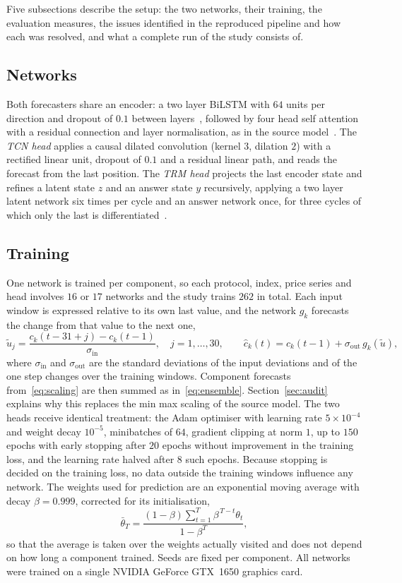 Five subsections describe the setup: the two networks, their training, the
evaluation measures, the issues identified in the reproduced pipeline and how
each was resolved, and what a complete run of the study consists of.

\subsection{Networks}
Both forecasters share an encoder: a two layer BiLSTM with $64$ units per
direction and dropout of $0.1$ between layers~\cite{rnnreview2024}, followed by
four head self attention with a residual connection and layer normalisation,
as in the source model~\cite{gong2024}. The \emph{TCN head} applies a causal
dilated convolution (kernel $3$, dilation $2$) with a rectified linear unit,
dropout of $0.1$ and a residual linear path, and reads the forecast from the
last position. The \emph{TRM head} projects the last encoder state and refines
a latent state $z$ and an answer state $y$ recursively, applying a two layer
latent network six times per cycle and an answer network once, for three
cycles of which only the last is differentiated~\cite{jolicoeur2025}.

\subsection{Training}
One network is trained per component, so each protocol, index, price series
and head involves $16$ or $17$ networks and the study trains $262$ in total.
Each input window is expressed relative to its own last value, and the network
$g_k$ forecasts the change from that value to the next one,
\begin{equation}
\tilde{u}_j=\frac{c_k(t-31+j)-c_k(t-1)}{\sigma_{\mathrm{in}}},\quad j=1,\dots,30,
\qquad
\hat{c}_k(t)=c_k(t-1)+\sigma_{\mathrm{out}}\,g_k(\tilde{u}),
\label{eq:scaling}
\end{equation}
where $\sigma_{\mathrm{in}}$ and $\sigma_{\mathrm{out}}$ are the standard
deviations of the input deviations and of the one step changes over the
training windows. Component forecasts from~\eqref{eq:scaling} are then summed
as in~\eqref{eq:ensemble}. Section~\ref{sec:audit} explains why this replaces
the min max scaling of the source model. The two heads receive identical
treatment: the Adam optimiser with learning rate $5\times10^{-4}$ and weight
decay $10^{-5}$, minibatches of $64$, gradient clipping at norm $1$, up to
$150$ epochs with early stopping after $20$ epochs without improvement in the
training loss, and the learning rate halved after $8$ such epochs. Because
stopping is decided on the training loss, no data outside the training windows
influence any network. The weights used for prediction are an exponential
moving average with decay $\beta=0.999$, corrected for its initialisation,
\begin{equation}
\bar{\theta}_T=\frac{(1-\beta)\sum_{t=1}^{T}\beta^{\,T-t}\theta_t}{1-\beta^{T}},
\label{eq:ema}
\end{equation}
so that the average is taken over the weights actually visited and does not
depend on how long a component trained. Seeds are fixed per component. All
networks were trained on a single NVIDIA GeForce GTX~1650 graphics card.

